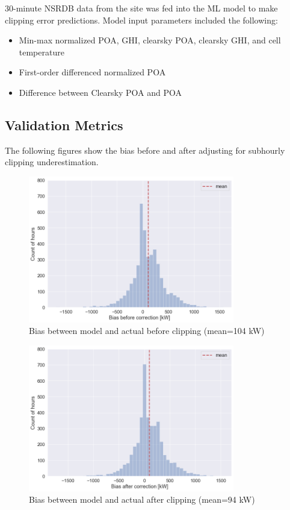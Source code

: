 \documentclass[conference]{IEEEtran}
\begin{document}
30-minute NSRDB data from the site was fed into the ML model to make clipping error predictions. Model input parameters included the following:
\begin{itemize}
\item Min-max normalized POA, GHI, clearsky POA, clearsky GHI, and cell temperature
\item First-order differenced normalized POA
\item Difference between Clearsky POA and POA
\end{itemize}

\subsection{Validation Metrics}
The following figures show the bias before and after adjusting for subhourly clipping underestimation.

\begin{figure}[htbp]
\centerline{\includegraphics[width=9cm]{Error_before_correction_3.png}}
\caption{Bias between model and actual before clipping (mean=104 kW)}
\label{fig:before-clipping-error}
\end{figure}

\begin{figure}[htbp]
\centerline{\includegraphics[width=9cm]{Error_after_correction_3.png}}
\caption{Bias between model and actual after clipping (mean=94 kW)}
\label{fig:after-clipping-error}
\end{figure}
\end{document}
